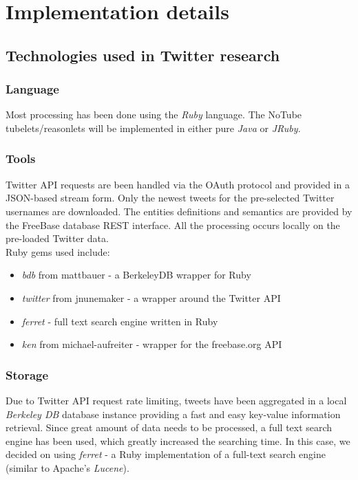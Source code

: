 \documentclass{article}
\begin{document}
%















\section{Implementation details}

\subsection{Technologies used in Twitter research}
\subsubsection{Language}
Most processing has been done using the \textit{Ruby} language. The NoTube tubelets/reasonlets will be implemented in either pure \textit{Java} or \textit{JRuby}.
\subsubsection{Tools}
Twitter API requests are been handled via the OAuth protocol and provided in a JSON-based stream form. Only the newest tweets for the pre-selected Twitter usernames are downloaded. The entities definitions and semantics are provided by the FreeBase database REST interface. All the processing occurs locally on the pre-loaded Twitter data. \\ Ruby gems used include:
\begin{itemize}
  \item \textit{bdb} from mattbauer - a BerkeleyDB wrapper for Ruby
  \item \textit{twitter} from jnunemaker - a wrapper around the Twitter API
  \item \textit{ferret} - full text search engine written in Ruby
  \item \textit{ken} from michael-aufreiter - wrapper for the freebase.org API
\end{itemize}
\subsubsection{Storage}
Due to Twitter API request rate limiting, tweets have been aggregated in a local
\textit{Berkeley DB} database instance providing a fast and easy key-value
information retrieval. Since great amount of data needs to be processed, a full
text search engine has been used, which greatly increased the searching time. In
this case, we decided on using \textit{ferret} - a Ruby implementation of a
full-text search engine (similar to Apache's \textit{Lucene}).



\end{document}
